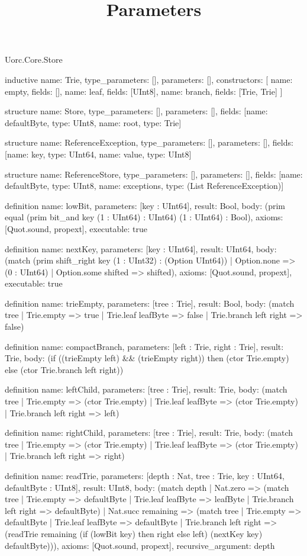 \begin{lexlean}{Uorc.Core.Store}
\title{Parameters}
\begin{semanticmodule}
inductive{
  name: Trie,
  type_parameters: [],
  parameters: [],
  constructors: [
    {name: empty, fields: []},
    {name: leaf, fields: [UInt8]},
    {name: branch, fields: [Trie, Trie]}
  ]
}

structure{
  name: Store,
  type_parameters: [],
  parameters: [],
  fields: [{name: defaultByte, type: UInt8}, {name: root, type: Trie}]
}

structure{
  name: ReferenceException,
  type_parameters: [],
  parameters: [],
  fields: [{name: key, type: UInt64}, {name: value, type: UInt8}]
}

structure{
  name: ReferenceStore,
  type_parameters: [],
  parameters: [],
  fields: [{name: defaultByte, type: UInt8}, {name: exceptions, type: (List ReferenceException)}]
}

definition{
  name: lowBit,
  parameters: [key : UInt64],
  result: Bool,
  body: (prim equal (prim bit_and key (1 : UInt64) : UInt64) (1 : UInt64) : Bool),
  axioms: [Quot.sound, propext],
  executable: true
}

definition{
  name: nextKey,
  parameters: [key : UInt64],
  result: UInt64,
  body: (match (prim shift_right key (1 : UInt32) : (Option UInt64))
    | Option.none => (0 : UInt64)
    | Option.some shifted => shifted),
  axioms: [Quot.sound, propext],
  executable: true
}

definition{
  name: trieEmpty,
  parameters: [tree : Trie],
  result: Bool,
  body: (match tree
    | Trie.empty => true
    | Trie.leaf leafByte => false
    | Trie.branch left right => false)
}

definition{
  name: compactBranch,
  parameters: [left : Trie, right : Trie],
  result: Trie,
  body: (if ((trieEmpty left) && (trieEmpty right)) then (ctor Trie.empty) else (ctor Trie.branch left right))
}

definition{
  name: leftChild,
  parameters: [tree : Trie],
  result: Trie,
  body: (match tree
    | Trie.empty => (ctor Trie.empty)
    | Trie.leaf leafByte => (ctor Trie.empty)
    | Trie.branch left right => left)
}

definition{
  name: rightChild,
  parameters: [tree : Trie],
  result: Trie,
  body: (match tree
    | Trie.empty => (ctor Trie.empty)
    | Trie.leaf leafByte => (ctor Trie.empty)
    | Trie.branch left right => right)
}

definition{
  name: readTrie,
  parameters: [depth : Nat, tree : Trie, key : UInt64, defaultByte : UInt8],
  result: UInt8,
  body: (match depth
    | Nat.zero => (match tree
      | Trie.empty => defaultByte
      | Trie.leaf leafByte => leafByte
      | Trie.branch left right => defaultByte)
    | Nat.succ remaining => (match tree
      | Trie.empty => defaultByte
      | Trie.leaf leafByte => defaultByte
      | Trie.branch left right => (readTrie remaining (if (lowBit key) then right else left) (nextKey key) defaultByte))),
  axioms: [Quot.sound, propext],
  recursive_argument: depth
}


\end{semanticmodule}
\end{lexlean}
